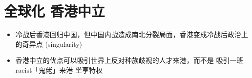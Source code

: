 \section{全球化 \textbullet 香港中立}

\begin{itemize}
	\item 冷战后香港回归中国，但中国内战造成南北分裂局面，香港变成冷战后政治上的奇异点 (singularity)
	\item 香港中立的优点可以吸引世界上反对种族歧视的人才来港，而不是 吸引一班 racist「鬼佬」来港 坐享特权
\end{itemize}

\printbibliography

